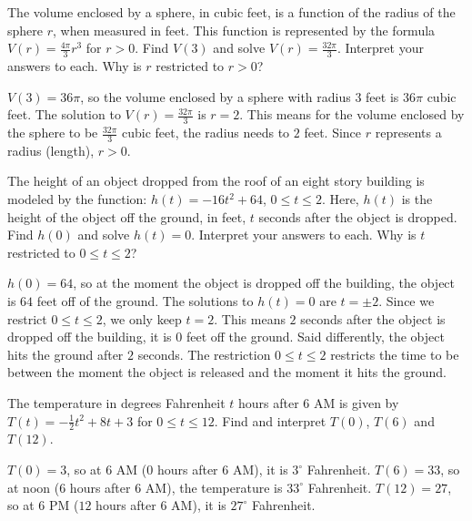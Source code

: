 \documentclass{ximera}
\begin{document}
\begin{problem}
The volume enclosed by a sphere, in cubic feet, is a function of the radius of the sphere $r$, when measured in feet. This function is represented by the formula  $V(r) =\frac{4\pi}{3} r^{3}$ for $r > 0$.  Find $V(3)$ and solve $V(r) = \frac{32\pi}{3}$.  Interpret your answers to each.  Why is $r$ restricted to $r > 0$?

\begin{solution}
$V(3) = 36\pi$, so the volume enclosed by a sphere with radius $3$ feet is $36\pi$ cubic feet.  The solution to $V(r) = \frac{32\pi}{3}$ is $r = 2$.  This means for the volume enclosed by the sphere to be $\frac{32\pi}{3}$ cubic feet, the radius needs to $2$ feet.  Since $r$ represents a radius (length), $r > 0$.
\end{solution}
\end{problem}

\begin{problem}
The height of an object dropped from the roof of an eight story building is modeled by the function:  $h(t) = -16t^2 + 64$, $0 \leq t \leq 2$. Here,  $h(t)$ is the height of the object off the ground, in feet, $t$ seconds after the object is dropped.  Find $h(0)$ and solve $h(t) = 0$.  Interpret your answers to each.  Why is $t$ restricted to $0 \leq t \leq 2$?

\begin{solution}
$h(0) = 64$, so at the moment the object is dropped off the building, the object is $64$ feet off of the ground.  The solutions to $h(t) = 0$ are $t = \pm 2$.  Since we restrict $0 \leq t \leq 2$, we only keep $t = 2$.  This means $2$ seconds after the object is dropped off the building, it is $0$ feet off the ground.  Said differently, the object hits the ground after $2$ seconds.  The restriction  $0 \leq t \leq 2$ restricts the time to be between the moment the object is released and the moment it hits the ground.
\end{solution}
\end{problem}

\begin{problem}
The temperature in degrees Fahrenheit $t$ hours after 6 AM is given by $T(t) = -\frac{1}{2} t^2 + 8t+3$ for $0 \leq t \leq 12$. Find and interpret $T(0)$, $T(6)$ and $T(12)$. 

\begin{solution}
$T(0) = 3$, so at 6 AM ($0$ hours after 6 AM), it is $3^{\circ}$ Fahrenheit.  $T(6) = 33$, so at noon ($6$ hours after 6 AM), the temperature is $33^{\circ}$ Fahrenheit.  $T(12) = 27$, so at 6 PM ($12$ hours after 6 AM), it is $27^{\circ}$ Fahrenheit.
\end{solution}
\end{problem}
\end{document}
